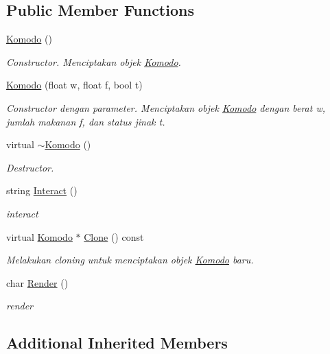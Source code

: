 \subsection*{Public Member Functions}
\begin{DoxyCompactItemize}
\item 
\hyperlink{classKomodo_a663a1a18bc7ac367f1a55a385604258d}{Komodo} ()
\begin{DoxyCompactList}\small\item\em Constructor. Menciptakan objek \hyperlink{classKomodo}{Komodo}. \end{DoxyCompactList}\item 
\hyperlink{classKomodo_ad98e389b1661efeeba847133e64c02e6}{Komodo} (float w, float f, bool t)
\begin{DoxyCompactList}\small\item\em Constructor dengan parameter. Menciptakan objek \hyperlink{classKomodo}{Komodo} dengan berat w, jumlah makanan f, dan status jinak t. \end{DoxyCompactList}\item 
virtual \hyperlink{classKomodo_a16e327cbffe1088c1f04c397c1fbc6dd}{$\sim$\+Komodo} ()
\begin{DoxyCompactList}\small\item\em Destructor. \end{DoxyCompactList}\item 
string \hyperlink{classKomodo_a250e6b06c369a94faaa551751cd09196}{Interact} ()
\begin{DoxyCompactList}\small\item\em interact \end{DoxyCompactList}\item 
virtual \hyperlink{classKomodo}{Komodo} $\ast$ \hyperlink{classKomodo_aab3bd7ee8235c87e8bbafd8848968be8}{Clone} () const 
\begin{DoxyCompactList}\small\item\em Melakukan cloning untuk menciptakan objek \hyperlink{classKomodo}{Komodo} baru. \end{DoxyCompactList}\item 
char \hyperlink{classKomodo_a06ce8ed3d58a33968ecf4a12a3ebbd4d}{Render} ()
\begin{DoxyCompactList}\small\item\em render \end{DoxyCompactList}\end{DoxyCompactItemize}
\subsection*{Additional Inherited Members}


